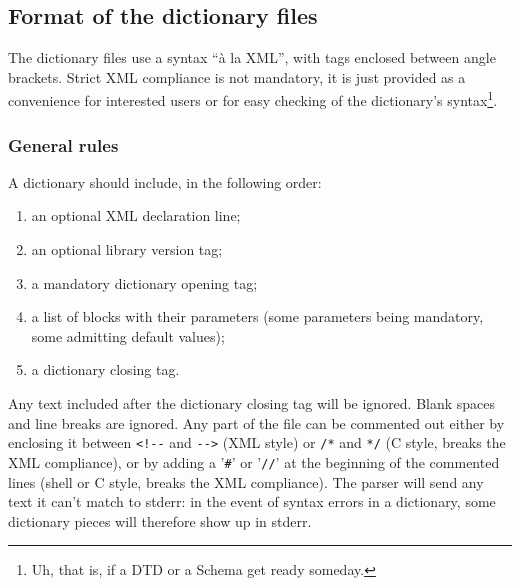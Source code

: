 \documentclass[11pt,a4paper]{article}
\begin{document}
\clearpage
\subsection{Format of the dictionary files \label{dict_format}}
The dictionary files use a syntax ``\`a la XML'', with tags enclosed between
angle brackets. Strict XML compliance is not mandatory, it is just provided as
a convenience for interested users or for easy checking of the dictionary's
syntax\footnote{Uh, that is, if a DTD or a Schema get ready someday.}.

\subsubsection*{General rules}
A dictionary should include, in the following order:
\begin{enumerate}
\item an optional XML declaration line;
\item an optional library version tag;
\item a mandatory dictionary opening tag;
\item a list of blocks with their parameters (some parameters being mandatory,
  some admitting default values);
\item a dictionary closing tag.
\end{enumerate}
Any text included after the dictionary closing tag will be ignored. Blank
spaces and line breaks are ignored. Any part of the file can be commented out
either by enclosing it between \verb+<!--+ and \verb+-->+ (XML style) or
\verb+/*+ and \verb+*/+ (C style, breaks the XML compliance), or by adding a
'\verb+#+' or '\verb+//+' at the beginning of the commented lines (shell or C
style, breaks the XML compliance). The parser will send any text it can't match
to stderr: in the event of syntax errors in a dictionary, some dictionary
pieces will therefore show up in stderr.
\end{document}
